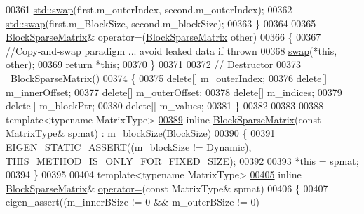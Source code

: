 \begin{DoxyCode}
00361       \hyperlink{endian_8c_a3ca5ecd34b04d6a243c054ac3a57f68d}{std::swap}(first.m\_outerIndex, second.m\_outerIndex);
00362       \hyperlink{endian_8c_a3ca5ecd34b04d6a243c054ac3a57f68d}{std::swap}(first.m\_BlockSize, second.m\_blockSize);
00363     \}
00364 
00365     \hyperlink{group___sparse_core___module_class_eigen_1_1_block_sparse_matrix}{BlockSparseMatrix}& operator=(\hyperlink{group___sparse_core___module_class_eigen_1_1_block_sparse_matrix}{BlockSparseMatrix} other)
00366     \{
00367       \textcolor{comment}{//Copy-and-swap paradigm ... avoid leaked data if thrown}
00368       \hyperlink{endian_8c_a3ca5ecd34b04d6a243c054ac3a57f68d}{swap}(*\textcolor{keyword}{this}, other);
00369       \textcolor{keywordflow}{return} *\textcolor{keyword}{this};
00370     \}
00371 
00372     \textcolor{comment}{// Destructor}
00373     ~\hyperlink{group___sparse_core___module_class_eigen_1_1_block_sparse_matrix}{BlockSparseMatrix}()
00374     \{
00375       \textcolor{keyword}{delete}[] m\_outerIndex;
00376       \textcolor{keyword}{delete}[] m\_innerOffset;
00377       \textcolor{keyword}{delete}[] m\_outerOffset;
00378       \textcolor{keyword}{delete}[] m\_indices;
00379       \textcolor{keyword}{delete}[] m\_blockPtr;
00380       \textcolor{keyword}{delete}[] m\_values;
00381     \}
00382 
00383 
00388     \textcolor{keyword}{template}<\textcolor{keyword}{typename} MatrixType>
\hyperlink{group___sparse_core___module_a1d5e6091b3a85a872f10a02265c3c8c6}{00389}     \textcolor{keyword}{inline} \hyperlink{group___sparse_core___module_a1d5e6091b3a85a872f10a02265c3c8c6}{BlockSparseMatrix}(\textcolor{keyword}{const} MatrixType& spmat) : m\_blockSize(BlockSize)
00390     \{
00391       EIGEN\_STATIC\_ASSERT((m\_blockSize != \hyperlink{namespace_eigen_ad81fa7195215a0ce30017dfac309f0b2}{Dynamic}), THIS\_METHOD\_IS\_ONLY\_FOR\_FIXED\_SIZE);
00392 
00393       *\textcolor{keyword}{this} = spmat;
00394     \}
00395 
00404     \textcolor{keyword}{template}<\textcolor{keyword}{typename} MatrixType>
\hyperlink{group___sparse_core___module_a5c5479fd38867538383e092a1d90db5a}{00405}     \textcolor{keyword}{inline} \hyperlink{group___sparse_core___module_class_eigen_1_1_block_sparse_matrix}{BlockSparseMatrix}& \hyperlink{group___sparse_core___module_a5c5479fd38867538383e092a1d90db5a}{operator=}(\textcolor{keyword}{const} MatrixType& spmat)
00406     \{
00407       eigen\_assert((m\_innerBSize != 0 && m\_outerBSize != 0)

\end{DoxyCode}
